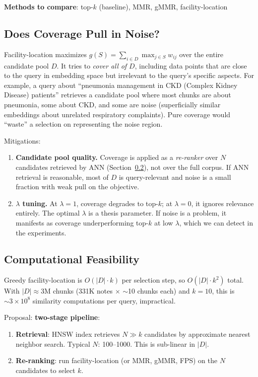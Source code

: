 \documentclass[11pt,a4paper]{article}
\begin{document}
\textbf{Methods to compare}: top-$k$ (baseline), MMR, gMMR,
facility-location

\subsection{Does Coverage Pull in Noise?}
\label{sec:coverage-noise}

Facility-location maximizes $g(S) = \sum_{i \in D} \max_{j \in S} w_{ij}$ over the entire candidate pool $D$.  It tries to \emph{cover all of $D$}, including data points that are close to the query in embedding space but irrelevant to the query's specific aspects.  For example, a query about ``pneumonia management in CKD (Complex Kidney Disease) patients'' retrieves a candidate pool where most chunks are about pneumonia, some about CKD, and some are noise (superficially similar embeddings about unrelated respiratory complaints).  Pure coverage would ``waste'' a selection on representing the noise region.

Mitigations:
\begin{enumerate}[leftmargin=*]
	\item \textbf{Candidate pool quality.}  Coverage is applied as a \emph{re-ranker} over $N$ candidates retrieved by ANN (Section~\ref{sec:computational}), not over the full corpus.  If ANN retrieval is reasonable, most of $D$ is query-relevant and noise is a small fraction with weak pull on the objective.
	\item \textbf{$\lambda$ tuning.}  At $\lambda = 1$, coverage degrades to top-$k$; at $\lambda = 0$, it ignores relevance entirely.  The optimal $\lambda$ is a thesis parameter.  If noise is a problem, it manifests as coverage underperforming top-$k$ at low $\lambda$, which we can detect in the experiments.
\end{enumerate}

\subsection{Computational Feasibility}
\label{sec:computational}

Greedy facility-location is $O(|D| \cdot k)$ per selection step, so $O(|D| \cdot k^2)$ total.  With $|D| \approx 3$M chunks (331K notes $\times$ $\sim$10 chunks each) and $k = 10$, this is $\sim 3 \times 10^8$ similarity computations per query, impractical.

Proposal: \textbf{two-stage pipeline}:
\begin{enumerate}[leftmargin=*]
	\item \textbf{Retrieval}: HNSW index retrieves $N \gg k$ candidates by approximate nearest neighbor search.  Typical $N$: 100--1000.  This is sub-linear in $|D|$.
	\item \textbf{Re-ranking}: run facility-location (or MMR, gMMR, FPS) on the $N$ candidates to select $k$.
\end{enumerate}
\end{document}
